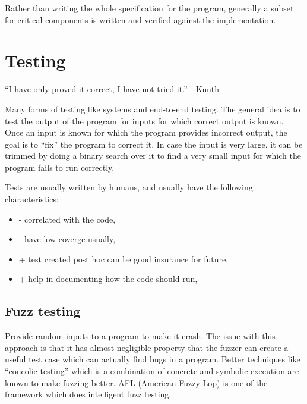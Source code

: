 \documentclass[twoside]{article}
\begin{document}
Rather than writing the whole specification for the program, generally a subset for critical components is written
and verified against the implementation.


\section*{Testing}
``I have only proved it correct, I have not tried it.'' - Knuth

Many forms of testing like systems and end-to-end testing.
The general idea is to test the output of the program for inputs for which correct output is known.
Once an input is known for which the program provides incorrect output, the goal is to ``fix'' the program to
correct it. In case the input is very large, it can be trimmed by doing a binary search over it to find a
very small input for which the program fails to run correctly.

Tests are usually written by humans, and usually have the following characteristics:
\begin{itemize}
\item - correlated with the code,
\item - have low coverge usually,
\item + test created post hoc can be good insurance for future,
\item + help in documenting how the code should run,
\end{itemize}

\subsection*{Fuzz testing}
Provide random inputs to a program to make it crash.
The issue with this approach is that it has almost negligible property that the fuzzer can create
a useful test case which can actually find bugs in a program.
Better techniques like ``concolic testing'' which is a combination of concrete and symbolic execution
are known to make fuzzing better.
AFL (American Fuzzy Lop) is one of the framework which does intelligent fuzz testing.
\end{document}
